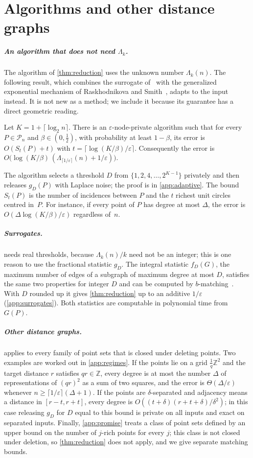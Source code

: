 \documentclass[anonymous,a4paper,USenglish,cleveref,autoref,thm-restate]{socg-lipics-v2021}
\newcommand{\Z}{\mathbb{Z}}
\newcommand{\eps}{\varepsilon}
\newcommand{\cP}{\mathcal{P}}
\newcommand{\Lam}{\Lambda}
\begin{document}
\section{Algorithms and other distance graphs}
\label{sec:privacy}

\subparagraph*{An algorithm that does not need $\Lam_k$.}
The algorithm of \cref{thm:reduction} uses the unknown number $\Lam_k(n)$. The following result, which combines the surrogate of~\cite{KNRS13} with the generalized exponential mechanism of Raskhodnikova and Smith~\cite{RS16}, adapts to the input instead. It is not new as a method; we include it because its guarantee has a direct geometric reading.

\begin{theorem}
\label{thm:adaptive}
Let $K=1+\lceil\log_2 n\rceil$. There is an $\eps$-node-private algorithm such that for every $P\in\cP_n$ and $\beta\in(0,\frac12)$, with probability at least $1-\beta$, its error is $O(S_t(P)+t)$ with $t=\lceil\log(K/\beta)/\eps\rceil$. Consequently the error is $O\bigl(\log(K/\beta)\,(\Lam_{\lceil1/\eps\rceil}(n)+1/\eps)\bigr)$.
\end{theorem}

The algorithm selects a threshold $D$ from $\{1,2,4,\dots,2^{K-1}\}$ privately and then releases $g_D(P)$ with Laplace noise; the proof is in \cref{app:adaptive}. The bound $S_t(P)$ is the number of incidences between $P$ and the $t$ richest unit circles centred in~$P$. For instance, if every point of $P$ has degree at most $\Delta$, the error is $O(\Delta\log(K/\beta)/\eps)$ regardless of~$n$.

\subparagraph*{Surrogates.}
 needs real thresholds, because $\Lam_k(n)/k$ need not be an integer; this is one reason to use the fractional statistic $g_D$. The integral statistic $f_D(G)$, the maximum number of edges of a subgraph of maximum degree at most $D$, satisfies the same two properties for integer $D$ and can be computed by $b$-matching~\cite{Schrijver03,Gabow18}. With $D$ rounded up it gives \cref{thm:reduction} up to an additive $1/\eps$ (\cref{app:surrogates}). Both statistics are computable in polynomial time from $G(P)$.

\subparagraph*{Other distance graphs.}
 applies to every family of point sets that is closed under deleting points. Two examples are worked out in \cref{app:regimes}. If the points lie on a grid $\frac1q\Z^2$ and the target distance $r$ satisfies $qr\in\Z$, every degree is at most the number $\Delta$ of representations of $(qr)^2$ as a sum of two squares, and the error is $\Theta(\Delta/\eps)$ whenever $n\ge\lceil 1/\eps\rceil(\Delta+1)$. If the points are $\delta$-separated and adjacency means a distance in $[r-t,r+t]$, every degree is $O((t+\delta)(r+t+\delta)/\delta^2)$; in this case releasing $g_D$ for $D$ equal to this bound is private on all inputs and exact on separated inputs. Finally, \cref{app:promise} treats a class of point sets defined by an upper bound on the number of $j$-rich points for every $j$; this class is not closed under deletion, so \cref{thm:reduction} does not apply, and we give separate matching bounds.
\end{document}
